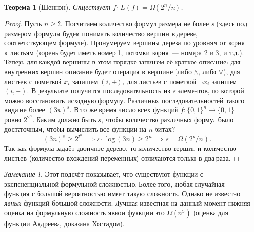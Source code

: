 \documentclass[12pt]{article}
\theoremstyle{definition}
\theoremstyle{plain}
\newtheorem{theorem}{Теорема}[section]
\theoremstyle{remark}
\newtheorem{remark}{Замечание}[section]
\begin{document}
\begin{theorem}[Шеннон]
    Существует $f$: $L(f) = \Omega(2^n/n)$.
\end{theorem}
\begin{proof}
    Пусть $n\ge 2$. Посчитаем количество формул размера не более $s$ (здесь под размером формулы будем понимать количество вершин в дереве, соответствующем формуле).  Пронумеруем вершины дерева по уровням от корня к листьям (корень будет иметь номер 1, потомки корня~--- номера 2 и 3, и т.д.). Теперь для каждой вершины в этом порядке запишем её краткое описание: для внутренних вершин описание будет операция в вершине (либо $\land$, либо $\lor$), для листьев с пометкой $x_i$ запишем $(i, +)$, для листьев с пометкой $\neg x_i$ запишем $(i,-)$. В результате получится последовательность из $s$ элементов, по которой можно восстановить исходную формулу. Различных последовательностей такого вида не более $(3 n)^s$.    
    В то же время число всех функций 
    $f: \{0,1\}^n \to \{0,1\}$ ровно $2^{2^n}$. Каким должно быть $s$, чтобы количество различных формул было достаточным, чтобы вычислить все функции на $n$ битах?
    $$(3 n)^s \ge 2^{2^n} \implies s\cdot \log(3 n) \ge 2^n \implies s = \Omega(2^n/n).$$
    Так как формула задаёт двоичное дерево, то количество вершин и количество листьев (количество вхождений переменных) отличаются только в два раза.
\end{proof}
\begin{remark}
    Этот подсчёт показывает, что существуют функции с экспоненциальной формульной сложностью.
    Более того, любая случайная функция с большой вероятностью имеет такую сложность.
    Однако не известно \emph{явных} функций большой сложности. Лучшая известная на данный момент
    нижняя оценка на формульную сложность явной функции это $\Omega(n^3)$ 
    (оценка для функции Андреева, доказана Хостадом).
\end{remark}
\end{document}
